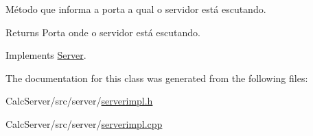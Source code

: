 Método que informa a porta a qual o servidor está escutando. 

\begin{DoxyReturn}{Returns}
Porta onde o servidor está escutando. 
\end{DoxyReturn}


Implements \hyperlink{classServer_ad32766e2608017d9fcd0903ab3748803}{Server}.



The documentation for this class was generated from the following files\+:\begin{DoxyCompactItemize}
\item 
Calc\+Server/src/server/\hyperlink{serverimpl_8h}{serverimpl.\+h}\item 
Calc\+Server/src/server/\hyperlink{serverimpl_8cpp}{serverimpl.\+cpp}\end{DoxyCompactItemize}

